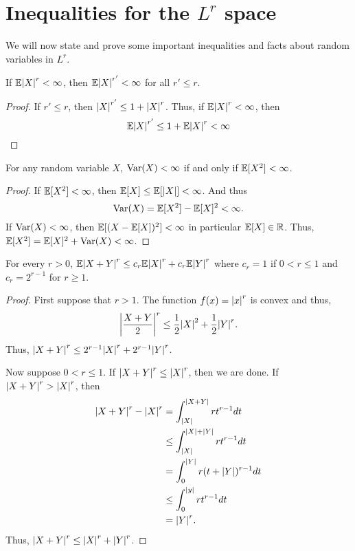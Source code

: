 \section{Inequalities for the $L^r$ space}
We will now state and prove some important inequalities and facts about random variables in $L^r$. 
\begin{proposition}
    If $\E\abs{X}^r < \infty$, then $\E\abs{X}^{r'} < \infty$ for all $r' \le r$.
\end{proposition}
\begin{proof}
    If $r'\le r$, then $\abs{X}^{r'} \le 1+\abs{X}^r$. Thus, if $\E\abs{X}^r < \infty$, then
    \[\E\abs{X}^{r'} \le 1+\E\abs{X}^r < \infty \qedhere  \]
\end{proof}
\begin{proposition}
    For any random variable $X$, $\V(X) < \infty$ if and only if $\E[X^2] < \infty$. 
\end{proposition}
\begin{proof}
    If $\E[X^2] < \infty$, then $\E[X] \le \E[\abs{X}] < \infty$. And thus 
    \[\V(X) = \E[X^2]-\E[X]^2 < \infty. \]
    If $\V(X)<\infty$, then $\E[(X-\E[X])^2] < \infty$ in particular $\E[X] \in \R$. Thus, $\E[X^2] = \E[X]^2+\V(X) < \infty$. 
\end{proof}
\begin{proposition}
    For every $r > 0$, $\E\abs{X+Y}^r \le c_r\E\abs{X}^r + c_r \E\abs{Y}^r$ where $c_r = 1$ if $0 < r \le 1$ and $c_r=2^{r-1}$ for $r \ge 1$.
\end{proposition}
\begin{proof}
    First suppose that $r > 1$. The function $f(x) = \abs{x}^r$ is convex and thus,
    \[\abs{\frac{X+Y}{2}}^r \le \frac{1}{2}\abs{X}^2+\frac{1}{2}\abs{Y}^r.\]
    Thus, $\abs{X+Y}^r \le 2^{r-1}\abs{X}^r+2^{r-1}\abs{Y}^r$.

    Now suppose $0 < r\le 1$. If $\abs{X+Y}^r \le \abs{X}^r$, then we are done. If $\abs{X+Y}^r > \abs{X}^r$, then 
    \begin{align*}
        \abs{X+Y}^r - \abs{X}^r &= \int_{\abs{X}}^{\abs{X+Y}} rt^{r-1}dt\\
        &\le \int_\abs{X}^{\abs{X}+\abs{Y}} rt^{r-1}dt\\
        &=\int_0^\abs{Y} r(t+\abs{Y})^{r-1}dt\\
        &\le \int_0^\abs{y} rt^{r-1}dt\\
        &= \abs{Y}^r.
    \end{align*}
    Thus, $\abs{X+Y}^r \le \abs{X}^r+\abs{Y}^r$. 
\end{proof}
